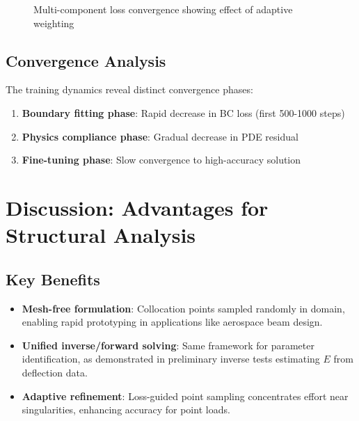 \documentclass[12pt]{article}
\begin{document}
\begin{figure}[htbp]
\centering
{}
\caption{Multi-component loss convergence showing effect of adaptive weighting}
\label{fig:point_convergence}
\end{figure}

\subsection{Convergence Analysis}
The training dynamics reveal distinct convergence phases:
\begin{enumerate}
    \item \textbf{Boundary fitting phase}: Rapid decrease in BC loss (first 500-1000 steps)
    \item \textbf{Physics compliance phase}: Gradual decrease in PDE residual
    \item \textbf{Fine-tuning phase}: Slow convergence to high-accuracy solution
\end{enumerate}


\section{Discussion: Advantages for Structural Analysis}
\subsection{Key Benefits}
\begin{itemize}
	\item \textbf{Mesh-free formulation}: Collocation points sampled randomly in domain, enabling rapid prototyping in applications like aerospace beam design.
	\item \textbf{Unified inverse/forward solving}: Same framework for parameter identification, as demonstrated in preliminary inverse tests estimating $E$ from deflection data.
	\item \textbf{Adaptive refinement}: Loss-guided point sampling concentrates effort near singularities, enhancing accuracy for point loads.
\end{itemize}
\end{document}
